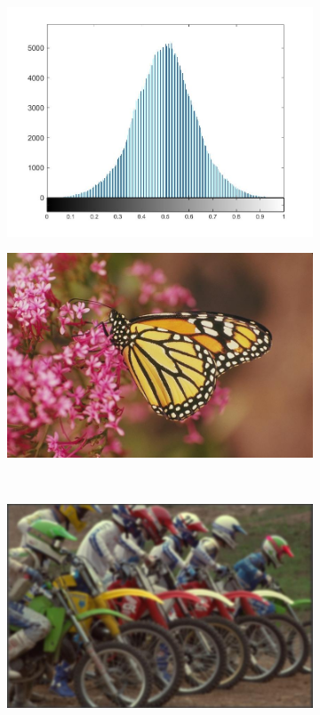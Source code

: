\begin{figure}
\begin{subfigure}[b]{0.23\textwidth}
         \includegraphics[width=\textwidth]{./figs/mscn_histmonarch}
         \caption{}
         \label{fig:nss3}
     \end{subfigure}
     \begin{subfigure}[b]{0.23\textwidth}
         \centering
         \includegraphics[width=\textwidth]{./figs/monarch}
         \caption{}
         \label{fig:nss4}
     \end{subfigure}
     \\
     \begin{subfigure}[b]{0.23\textwidth}
         \centering
         \includegraphics[width=\textwidth]{./figs/blur}

\end{subfigure}
\end{figure}
